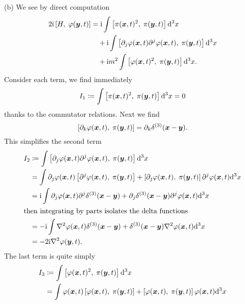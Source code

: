 \begin{soln}
(b) We see by direct computation
\begin{equation}
\begin{split}
2\I\commutator{H}{\varphi(\vec{y},t)}&=
 \I\int\commutator{\pi(\vec{x},t)^{2}}{\pi(\vec{y},t)}\D^{3}x\\
&\quad+\I\int\commutator{\partial_{j}\varphi(\vec{x},t)\partial^{j}\varphi(\vec{x},t)}{\pi(\vec{y},t)}\D^{3}x\\
&\quad+\I m^{2}\int\commutator{\varphi(\vec{x},t)^{2}}{\pi(\vec{y},t)}\D^{3}x.
\end{split}
\end{equation}
Consider each term, we find immediately
\begin{equation}
I_{1}\eqDef\int\commutator{\pi(\vec{x},t)^{2}}{\pi(\vec{y},t)}\D^{3}x=0
\end{equation}
thanks to the commutator relations. Next we find
\begin{equation}
\commutator{\partial_{k}\varphi(\vec{x},t)}{\pi(\vec{y},t)}=\partial_{k}\delta^{(3)}(\vec{x}-\vec{y}).
\end{equation}
This simplifies the second term
\begin{subequations}
\begin{align}
I_{2}&\eqDef\int\commutator{\partial_{j}\varphi(\vec{x},t)\partial^{j}\varphi(\vec{x},t)}{\pi(\vec{y},t)}\D^{3}x\\
&=\int\partial_{j}\varphi(\vec{x},t)\commutator{\partial^{j}\varphi(\vec{x},t)}{\pi(\vec{y},t)}+\commutator{\partial_{j}\varphi(\vec{x},t)}{\pi(\vec{y},t)}\partial^{j}\varphi(\vec{x},t)\D^{3}x\\
&=\I\int\partial_{j}\varphi(\vec{x},t)\partial^{j}\delta^{(3)}(\vec{x}-\vec{y})+\partial_{j}\delta^{(3)}(\vec{x}-\vec{y})\partial^{j}\varphi(\vec{x},t)\D^{3}x\\
\intertext{then integrating by parts isolates the delta functions}
&=-\I\int\nabla^{2}\varphi(\vec{x},t)\delta^{(3)}(\vec{x}-\vec{y})+\delta^{(3)}(\vec{x}-\vec{y})\nabla^{2}\varphi(\vec{x},t)\D^{3}x\\
&=-2\I\nabla^{2}\varphi(\vec{y},t).
\end{align}
\end{subequations}
The last term is quite simply
\begin{subequations}
\begin{align}
I_{3} &\eqDef\int\commutator{\varphi(\vec{x},t)^{2}}{\pi(\vec{y},t)}\D^{3}x\\
&=\int\varphi(\vec{x},t)\commutator{\varphi(\vec{x},t)}{\pi(\vec{y},t)}+\commutator{\varphi(\vec{x},t)}{\pi(\vec{y},t)}\varphi(\vec{x},t)\D^{3}x\\

\end{align}
\end{subequations}
\end{soln}
